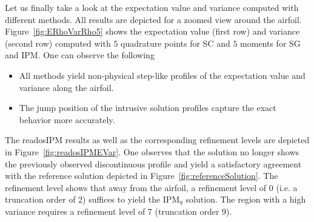 Let us finally take a look at the expectation value and variance computed with different methods. All results are depicted for a zoomed view around the airfoil. Figure~\ref{fig:ERhoVarRho5} shows the expectation value (first row) and variance (second row) computed with $5$ quadrature points for SC and $5$ moments for SG and IPM. One can observe the following
\begin{itemize}
\item All methods yield non-physical step-like profiles of the expectation value and variance along the airfoil. 
\item The jump position of the intrusive solution profiles capture the exact behavior more accurately.
\end{itemize}
The readosIPM results as well as the corresponding refinement levels are depicted in Figure~\ref{fig:readosIPMEVar}. One observes that the solution no longer shows the previously observed discontinuous profile and yield a satisfactory agreement with the reference solution depicted in Figure~\ref{fig:referenceSolution}. The refinement level shows that away from the airfoil, a refinement level of 0 (i.e. a truncation order of 2) suffices to yield the IPM$_9$ solution. The region with a high variance requires a refinement level of 7 (truncation order 9).
